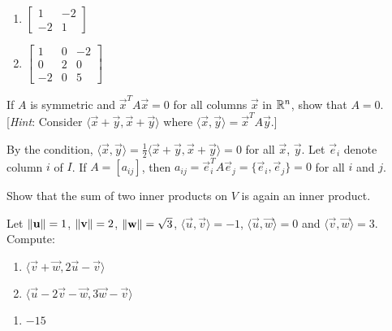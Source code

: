 \documentclass{ximera}
\begin{document}
\begin{problem}
\begin{enumerate}
\end{enumerate}
\begin{hint}
\begin{enumerate} 
 
\item $\left[ \begin{array}{rr}
1 & -2 \\
-2 & 1
\end{array} \right]$


\item $\left[ \begin{array}{rrr}
1 & 0 & -2 \\
0 & 2 & 0 \\
-2 & 0 & 5
\end{array} \right]$

\end{enumerate}
\end{hint}
\end{problem}

\begin{problem}\label{prob:inner_prod_14}
If $A$ is symmetric and $\vec{x}^{T}A\vec{x} = 0$ for all columns $\vec{x}$ in $\mathbb{R}^n$, show that $A = 0$. [\textit{Hint}: Consider
$\langle \vec{x} + \vec{y}, \vec{x} + \vec{y} \rangle$ where $\langle \vec{x}, \vec{y} \rangle = \vec{x}^TA\vec{y}$.]

\begin{hint}
By the condition, $\langle \vec{x}, \vec{y} \rangle = \frac{1}{2} \langle \vec{x} + \vec{y}, \vec{x} + \vec{y} \rangle = 0$ for all $\vec{x}$, $\vec{y}$. Let $\vec{e}_{i}$ denote column $i$ of $I$. If $A = \left[ a_{ij} \right]$, then $a_{ij} = \vec{e}_{i}^{T}A\vec{e}_{j} = \{\vec{e}_{i}, \vec{e}_{j}\} = 0$ for all $i$ and $j$.
\end{hint}
\end{problem}

\begin{problem}\label{prob:inner_prod_15}
Show that the sum of two inner products on $V$ is again an inner product.
\end{problem}

\begin{problem} \label{ex:10_1_16}
Let $ \left\lVert \mathbf{u} \right\rVert = 1$, $\left\lVert \mathbf{v} \right\rVert = 2$, $\left\lVert \mathbf{w} \right\rVert = \sqrt{3} $, $\langle \vec{u}, \vec{v} \rangle = -1$, $\langle\vec{u}, \vec{w}\rangle = 0$ and $\langle\vec{v}, \vec{w}\rangle = 3$. Compute:
\begin{enumerate}
\item $\langle \vec{v} + \vec{w}, 2\vec{u} - \vec{v} \rangle$
\item $\langle \vec{u} - 2 \vec{v} - \vec{w}, 3\vec{w} - \vec{v} \rangle$
\end{enumerate}
\begin{hint}
\begin{enumerate} 

\item  $-15$

\end{enumerate}
\end{hint}
\end{problem}
\end{document}
